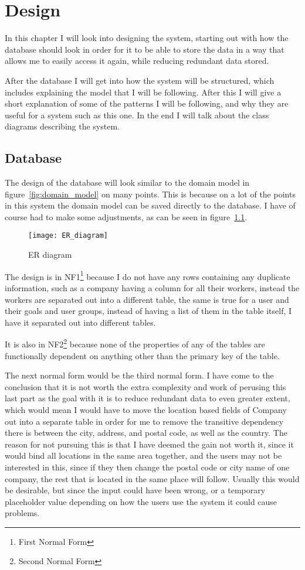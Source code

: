 \chapter{Design}
\label{chap:Design}
In this chapter I will look into designing the system, starting out with how the
database should look in order for it to be able to store the data in a way that
allows me to easily access it again, while reducing redundant data stored. 

After the database I will get into how the system will be structured, which
includes explaining the model that I will be following. After this I will give a
short explanation of some of the patterns I will be following, and why they are
useful for a system such as this one. In the end I will talk about the class
diagrams describing the system.

\section{Database}
\label{sec:Database}
The design of the database will look similar to the domain model
in figure~\ref{fig:domain_model} on many points. This is because on a lot of the
points in this system the domain model can be saved directly to the database. I
have of course had to make some adjustments, as can be seen in
figure~\ref{fig:er_diagram}.

\begin{figure}
  \texttt{[image: ER\_diagram]}
  \caption{ER diagram}
  \label{fig:er_diagram}
\end{figure}

The design is in NF1\footnote{First Normal Form} because I do not have any rows
containing any duplicate information, such as a company having a column for all
their workers, instead the workers are separated out into a different
table\cite[p.~430]{DB_systems}, the same is true for a user and their goals and
user groups, instead of having a list of them in the table itself, I have it
separated out into different tables. 

It is also in NF2\footnote{Second Normal Form} because none of the properties of
any of the tables are functionally dependent on anything other than the primary
key of the table\cite[p.~434]{DB_systems}. 

The next normal form would be the third normal form. I have come to the
conclusion that it is not worth the extra complexity and work of perusing this
last part as the goal with it is to reduce redundant data to even greater
extent, which would mean I would have to move the location based fields of
Company out into a separate table in order for me to remove the transitive
dependency\cite[p.~436]{DB_systems} there is between the city, address, and
postal code, as well as the country. The reason for not pursuing this is that I
have deemed the gain not worth it, since it would bind all locations in the same
area together, and the users may not be interested in this, since if they then
change the postal code or city name of one company, the rest that is located in
the same place will follow. Usually this would be desirable, but since the input
could have been wrong, or a temporary placeholder value depending on how the
users use the system it could cause problems. 


